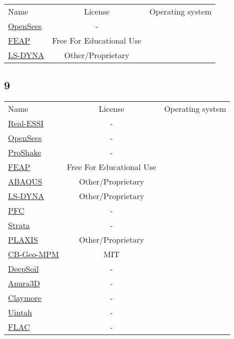 \begin{table}[]
    \centering
    \begin{tabular}{l|cc}
    \toprule
    Name &  License & Operating system\\ 
        \href{https://opensees.berkeley.edu/}{OpenSees} & - &\\
        \href{http://feap.berkeley.edu/}{FEAP} &  Free For Educational Use &\\
        \href{http://www.lstc.com/}{LS-DYNA} &  Other/Proprietary  &\\ 
    \bottomrule
    \end{tabular}
\end{table}

\subsection{9}

\begin{table}[]
    \centering
    \begin{tabular}{l|cc}
    \toprule
    Name &  License & Operating system\\ 
        \href{http://real-essi.us/}{Real-ESSI} & - &\\
        \href{https://opensees.berkeley.edu/}{OpenSees} & - &\\
        \href{http://www.proshake.com/}{ProShake} & - &\\
        \href{http://feap.berkeley.edu/}{FEAP} &  Free For Educational Use &\\
        \href{www.simulia.com}{ABAQUS} &  Other/Proprietary  &\\
        \href{http://www.lstc.com/}{LS-DYNA} &  Other/Proprietary  &\\
        \href{https://www.itascainternational.com/software/pfc}{PFC} & - &\\
        \href{https://github.com/arkottke/strata}{Strata} & - &\\
        \href{https://www.bentley.com/en/products/brands/plaxis}{PLAXIS} &  Other/Proprietary  &\\
        \href{https://www.cb-geo.com/research/mpm/}{CB-Geo-MPM} &  MIT  &\\
        \href{http://deepsoil.cee.illinois.edu/}{DeepSoil} & - &\\
        \href{http://www.mpm-dredge.eu/}{Anura3D} & - &\\
        \href{https://github.com/penn-graphics-research/claymore}{Claymore} & - &\\
        \href{http://uintah.utah.edu/}{Uintah} & - &\\
        \href{https://www.itascacg.com/software/FLAC}{FLAC} & - &\\ 
    \bottomrule
    \end{tabular}
\end{table}

